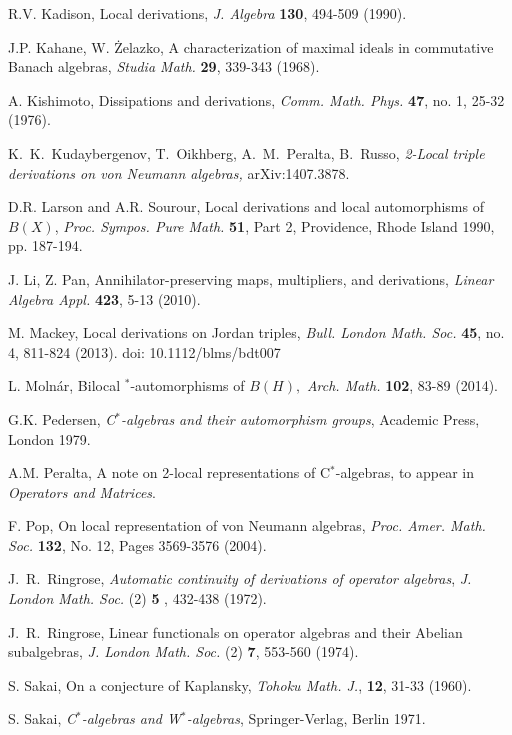 \documentclass[11pt]{amsart}
\begin{document}
\begin{thebibliography}{22}
 R.V. Kadison, Local derivations, \emph{J. Algebra} \textbf{130}, 494-509 (1990).

 J.P. Kahane, W. \.{Z}elazko, A characterization of maximal ideals in commutative Banach algebras,
\emph{Studia Math.} \textbf{29}, 339-343 (1968).

 A. Kishimoto, Dissipations and derivations, \emph{Comm. Math. Phys.} \textbf{47}, no. 1, 25-32 (1976).

{K.~K.~Kudaybergenov, T.~Oikhberg, A.~M.~Peralta, B.~Russo,}
\textit{2-Local triple derivations on von Neumann algebras,}
arXiv:1407.3878.

 D.R. Larson and A.R. Sourour, Local derivations and local automorphisms of $B(X)$, \emph{Proc. Sympos. Pure Math.} \textbf{51}, Part 2, Providence, Rhode Island 1990, pp. 187-194.

 J. Li, Z. Pan, Annihilator-preserving maps, multipliers, and derivations, \emph{Linear Algebra Appl.} \textbf{423}, 5-13 (2010).

 M. Mackey, Local derivations on Jordan triples, \emph{Bull. London Math. Soc.} \textbf{45}, no. 4, 811-824 (2013). doi: 10.1112/blms/bdt007

 L. Moln\'{a}r, Bilocal $^*$-automorphisms of $B(H),$ \emph{Arch. Math.} \textbf{102}, 83-89 (2014).

 G.K. Pedersen, \emph{C$^*$-algebras and their automorphism groups}, Academic Press, London 1979.

 A.M. Peralta, A note on 2-local representations of C$^*$-algebras, to appear in \emph{Operators and Matrices}.

 F. Pop, On local representation of von Neumann algebras, \emph{Proc. Amer. Math. Soc.} \textbf{132}, No. 12, Pages 3569-3576 (2004).

 J.\ R.\ Ringrose, \emph{Automatic continuity of derivations of operator algebras},
\emph{J. London Math. Soc.} (2) \textbf{5} , 432-438 (1972).

 J.\ R.\ Ringrose, Linear functionals on operator algebras and their Abelian subalgebras, \emph{J. London Math. Soc.} (2) \textbf{7}, 553-560 (1974).

 S. Sakai, On a conjecture of Kaplansky, \emph{Tohoku Math. J.}, \textbf{12}, 31-33 (1960).

 S. Sakai, \emph{C$^*$-algebras and W$^*$-algebras}, Springer-Verlag, Berlin 1971.


\end{thebibliography}
\end{document}
